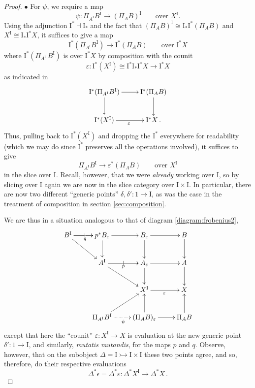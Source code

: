 \documentclass[11pt]{article}
\newcommand{\mono}{\ensuremath{\rightarrowtail}}
\newcommand{\ra}{\ensuremath{\rightarrow}}
\newcommand{\I}{\ensuremath{\mathrm{I}}}
\theoremstyle{remark}
\theoremstyle{definition}
\begin{document}
\begin{proof}
\medskip
\noindent $\bullet$ For $\psi$, we require a map 
\[
\psi:\Pi_{A^\I}B^\I \to (\Pi_AB)^\I \qquad \text{over $X^\I$.}
\]
Using the adjunction $\I^*\!\dashv \I_*$ and the fact that $(\Pi_AB)^\I  \cong \I_*\I^*(\Pi_AB)$ and $X^\I \cong \I_*\I^*X$, it suffices to give a map  
\[
\I^*(\Pi_{A^\I}B^\I) \to \I^*(\Pi_AB) \qquad \text{over $\I^*X$}
\]
where $\I^*(\Pi_{A^\I}\,B^\I)$ is over $\I^*X$ by composition with the counit
\[
\varepsilon: \I^*(X^\I)\cong \I^*\I_*\I^*X \to \I^*X
\]
as indicated in
\begin{equation}\label{diagram:frobenius5}
\xymatrix{
\I^*(\Pi_{A^\I}B^\I) \ar[r] \ar[d] &  \I^*(\Pi_AB)  \ar[d] \\
\I^*(X^\I) \ar[r]_\varepsilon & \I^*X\,.
}
\end{equation}
Thus, pulling back to $\I^*(X^\I)$ and dropping the $\I^*$ everywhere for readability (which we may do since $\I^*$ preserves all the operations involved), it suffices to give
\begin{equation}\label{eq:needforpsi}
\Pi_{A^\I}B^\I \to \varepsilon^*(\Pi_AB) \qquad \text{over $X^\I$}
\end{equation}
in the slice over $\I$. Recall, however, that we were \emph{already} working over $\I$, so by slicing over $\I$ again we are now in the slice category over $\I\times\I$.  In particular, there are now two different ``generic points'' $\delta, \delta' : 1 \ra \I$, as was the case in the treatment of composition in section \ref{sec:composition}.

We are thus in a situation analogous to that of diagram \ref{diagram:frobenius2},  
\begin{equation}\label{diagram:frobenius6}
\xymatrix{
B^\I \ar[r]|| \ar[r]_{q} \ar[rd]  & p^*B_\varepsilon \ar[r]  \ar[d]  & B_{\varepsilon}  \ar[d]   \ar[r] & B \ar[d] \\
& A^\I \ar[r]|| \ar[r]_{p}  \ar[rd]  & A_{\varepsilon} \ar[d]   \ar[r] & A \ar[d] \\
&& X^\I \ar[r]_{\varepsilon} &  X \\
& \Pi_{A^\I}B^\I \ar[ru] \ar@{..>}[r]_\psi  & (\Pi_AB)_\varepsilon  \ar[u] \ar[r] & \Pi_AB \ar[u]
}
\end{equation}
except that here the ``counit'' $\varepsilon: X^\I \ra X$ is evaluation at the new generic point $\delta': 1\ra \I$, and similarly, \emph{mutatis mutandis}, for the maps $p$ and $q$.  
Observe, however, that on the subobject $\Delta = \I \mono \I\times\I$ these two points agree, and so, therefore, do their respective evaluations $$\Delta^*\epsilon = \Delta^*\varepsilon: \Delta^*X^\I \to \Delta^*X\,.$$


\end{proof}
\end{document}
